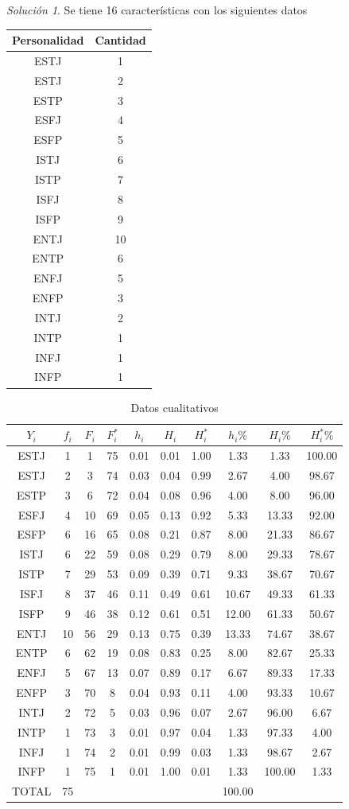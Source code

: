 \documentclass[10pt,]{krantz}
\theoremstyle{definition}
\theoremstyle{definition}
\theoremstyle{definition}
\theoremstyle{definition}
\theoremstyle{remark}
\newtheorem*{solution}{Solución}
\begin{document}
\begin{solution}
{}
Se tiene 16 características con los siguientes datos

\begin{longtable}[]{@{}cc@{}}
\toprule
Personalidad & Cantidad\tabularnewline
\midrule
\endhead
ESTJ & 1\tabularnewline
ESTJ & 2\tabularnewline
ESTP & 3\tabularnewline
ESFJ & 4\tabularnewline
ESFP & 5\tabularnewline
ISTJ & 6\tabularnewline
ISTP & 7\tabularnewline
ISFJ & 8\tabularnewline
ISFP & 9\tabularnewline
ENTJ & 10\tabularnewline
ENTP & 6\tabularnewline
ENFJ & 5\tabularnewline
ENFP & 3\tabularnewline
INTJ & 2\tabularnewline
INTP & 1\tabularnewline
INFJ & 1\tabularnewline
INFP & 1\tabularnewline
\bottomrule
\end{longtable}
\end{solution}

\begin{longtable}[t]{cccccccccc}
\caption{\label{tab:cualitativa}Datos cualitativos}\\
\toprule
$Y_i$ & $f_i$ & $F_i$ & $F_i^*$ & $h_i$ & $H_i$ & $H_i^*$ & $h_i\%$ & $H_i\%$ & $H_i^*\%$\\
\midrule
ESTJ & 1 & 1 & 75 & 0.01 & 0.01 & 1.00 & 1.33 & 1.33 & 100.00\\
ESTJ & 2 & 3 & 74 & 0.03 & 0.04 & 0.99 & 2.67 & 4.00 & 98.67\\
ESTP & 3 & 6 & 72 & 0.04 & 0.08 & 0.96 & 4.00 & 8.00 & 96.00\\
ESFJ & 4 & 10 & 69 & 0.05 & 0.13 & 0.92 & 5.33 & 13.33 & 92.00\\
ESFP & 6 & 16 & 65 & 0.08 & 0.21 & 0.87 & 8.00 & 21.33 & 86.67\\
ISTJ & 6 & 22 & 59 & 0.08 & 0.29 & 0.79 & 8.00 & 29.33 & 78.67\\
ISTP & 7 & 29 & 53 & 0.09 & 0.39 & 0.71 & 9.33 & 38.67 & 70.67\\
ISFJ & 8 & 37 & 46 & 0.11 & 0.49 & 0.61 & 10.67 & 49.33 & 61.33\\
ISFP & 9 & 46 & 38 & 0.12 & 0.61 & 0.51 & 12.00 & 61.33 & 50.67\\
ENTJ & 10 & 56 & 29 & 0.13 & 0.75 & 0.39 & 13.33 & 74.67 & 38.67\\
ENTP & 6 & 62 & 19 & 0.08 & 0.83 & 0.25 & 8.00 & 82.67 & 25.33\\
ENFJ & 5 & 67 & 13 & 0.07 & 0.89 & 0.17 & 6.67 & 89.33 & 17.33\\
ENFP & 3 & 70 & 8 & 0.04 & 0.93 & 0.11 & 4.00 & 93.33 & 10.67\\
INTJ & 2 & 72 & 5 & 0.03 & 0.96 & 0.07 & 2.67 & 96.00 & 6.67\\
INTP & 1 & 73 & 3 & 0.01 & 0.97 & 0.04 & 1.33 & 97.33 & 4.00\\
INFJ & 1 & 74 & 2 & 0.01 & 0.99 & 0.03 & 1.33 & 98.67 & 2.67\\
INFP & 1 & 75 & 1 & 0.01 & 1.00 & 0.01 & 1.33 & 100.00 & 1.33\\
TOTAL & 75 &  &  &  &  &  & 100.00 &  & \\
\bottomrule
\end{longtable}
\end{document}
